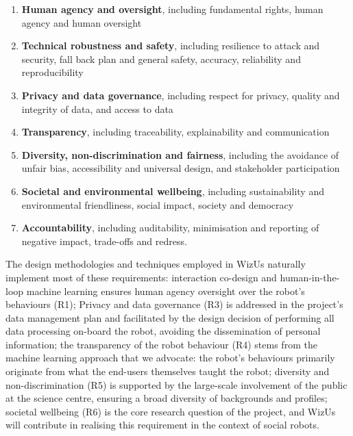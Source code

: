 \documentclass[11pt,a4paper]{report}
\newcommand{\project}{WizUs\xspace}
\begin{document}
\begin{enumerate}[label=\textbf{R\arabic*}]
    \item \textbf{Human agency and oversight}, including
            fundamental rights, human agency and human oversight

    \item \textbf{Technical robustness and safety}, including resilience to
        attack and security, fall back plan and general safety, accuracy,
        reliability and reproducibility

    \item \textbf{Privacy and data governance}, including respect for privacy,
        quality and integrity of data, and access to data

    \item \textbf{Transparency}, including traceability, explainability and
        communication

    \item \textbf{Diversity, non-discrimination and fairness}, including the
        avoidance of unfair bias, accessibility and universal design, and
        stakeholder participation

    \item \textbf{Societal and environmental wellbeing}, including
        sustainability and environmental friendliness, social impact, society
        and democracy

    \item \textbf{Accountability}, including auditability, minimisation and
        reporting of negative impact, trade-offs and redress.

\end{enumerate}

The design methodologies and techniques employed in \project naturally implement
most of these requirements: interaction co-design and human-in-the-loop machine
learning ensures human agency oversight over the robot's behaviours (R1);
Privacy and data governance (R3) is addressed in the project's data management
plan and facilitated by the design decision of performing all data processing
on-board the robot, avoiding the dissemination of personal information; the
transparency of the robot behaviour (R4) stems from the machine learning
approach that we advocate: the robot's behaviours primarily originate from what
the end-users themselves taught the robot; diversity and non-discrimination (R5)
is supported by the large-scale involvement of the public at the science centre,
ensuring a broad diversity of backgrounds and profiles; societal wellbeing (R6)
is the core research question of the project, and \project will contribute in
realising this requirement in the context of social robots.
\end{document}
